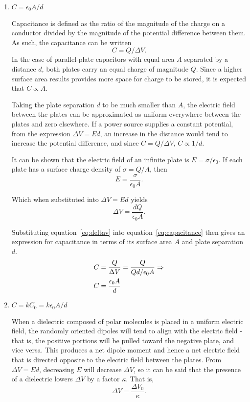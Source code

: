 \documentclass[twocolumn,english]{IEEEtran}
\theoremstyle{plain}
\theoremstyle{plain}
\begin{document}
\begin{enumerate}
\item $C={\epsilon}_0 A/d$

  Capacitance is defined as the ratio of the magnitude of the charge on a conductor divided by the magnitude of the potential difference between them. As such, the capacitance can be written
  \begin{equation}\label{eq:capacitance}
  C=Q/\Delta V.
  \end{equation}
  In the case of parallel-plate capacitors with equal area $A$ separated by a distance $d$, both plates carry an equal charge of magnitude $Q$. Since a higher surface area results provides more space for charge to be stored, it is expected that $C\propto A$.

  Taking the plate separation $d$ to be much smaller than $A$, the electric field between the plates can be approximated as uniform everywhere between the plates and zero elsewhere. If a power source supplies a constant potential, from the expression $\Delta V = Ed$, an increase in the distance would tend to increase the potential difference, and since $C=Q/\Delta V$, $C\propto 1/d$.

  It can be shown that the electric field of an infinite plate is $E=\sigma / \epsilon_0$. If each plate has a surface charge density of $\sigma = Q/A$, then
  \begin{equation*}
  E = \frac{\sigma}{\epsilon_0 A}.
  \end{equation*}

  Which when substituted into $\Delta V = Ed$ yields
  \begin{equation}\label{eq:deltav}
  \Delta V = \frac{dQ}{\epsilon_0 A}.
  \end{equation}

  Substituting equation~\ref{eq:deltav} into equation~\ref{eq:capacitance} then gives an expression for capacitance in terms of its surface area $A$ and plate separation $d$.~\cite{serway2013physics}
  \begin{align}\label{eq:finalcapeq}
  C &= \frac{Q}{\Delta V} = \frac{Q}{Qd/ \epsilon_0 A} \Rightarrow \notag \\
  C &= \frac{\epsilon_0 A}{d}
  \end{align}


\item $C=kC_0=k{\epsilon}_0 A/d$

When a dielectric composed of polar molecules is placed in a uniform electric field, the randomly oriented dipoles will tend to align with the electric field - that is, the positive portions will be pulled toward the negative plate, and vice versa. This produces a net dipole moment and hence a net electric field that is directed opposite to the electric field between the plates. From $\Delta V = Ed$, decreasing $E$ will decrease $\Delta V$, so it can be said that the presence of a dielectric lowers $\Delta V$ by a factor $\kappa$. That is,
\begin{equation}\label{eq:kappa1}
  \Delta V = \frac{\Delta V_0}{\kappa}.
\end{equation}



\end{enumerate}
\end{document}
